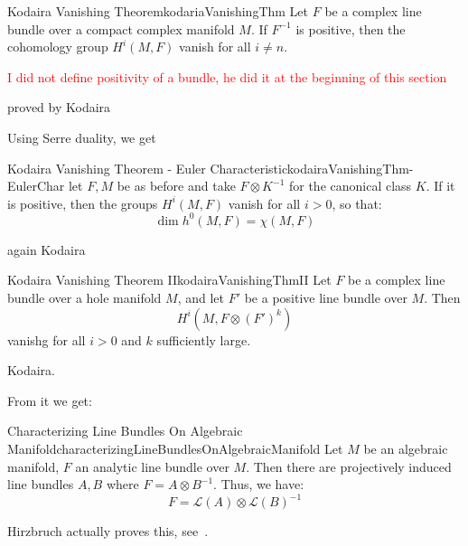 \documentclass{book}
\newcommand{\CL}{{\mathcal{L}}}
\begin{document}
\begin{thm}{Kodaira Vanishing Theorem}{kodariaVanishingThm}
  Let $F$ be a complex line bundle over a compact complex manifold $M$. If $F^{-1}$ is positive, then the
  cohomology group $H^i(M, F)$ vanish for all $i \ne n$.
\end{thm}

\textcolor{red}{I did not define positivity of a bundle, he did it at the beginning of this section}

\begin{Proof}
  proved by Kodaira
\end{Proof}

Using Serre duality, we get

\begin{thm}{Kodaira Vanishing Theorem - Euler Characteristic}{kodairaVanishingThm-EulerChar}
  let $F,M$ be as before and take $F\otimes K^{-1}$ for the canonical class $K$. If it is positive, then the
  groups $H^i(M, F)$ vanish for all $i > 0$, so that:
  \[
    \dim h^0(M, F) = \chi(M, F)
  \]
\end{thm}

\begin{Proof}
  again Kodaira
\end{Proof}

\begin{thm}{Kodaira Vanishing Theorem II}{kodairaVanishingThmII}
  Let $F$ be a complex line bundle over a hole manifold $M$, and let $F'$ be a positive line bundle over $M$.
  Then
  \[
    H^i(M, F\otimes (F')^k)
  \]
  vanishg for all $i > 0$ and $k$ sufficiently large.
\end{thm}

\begin{Proof}
  Kodaira.
\end{Proof}

From it we get:

\begin{thm}{Characterizing Line Bundles On Algebraic Manifold}{characterizingLineBundlesOnAlgebraicManifold}
  Let $M$ be an algebraic manifold, $F$ an analytic line bundle over $M$. Then there are projectively induced
  line bundles $A,B$ where $F = A\otimes B^{-1}$. Thus, we have:
  \[
    F = \CL(A)\otimes \CL(B)^{-1}
  \]
\end{thm}

\begin{Proof}
  Hirzbruch actually proves this, see~\cite[p.141, thm~18.2.5]{hirzebruchTopologicalMethodsAlgebraic1995}.
\end{Proof}
\end{document}
